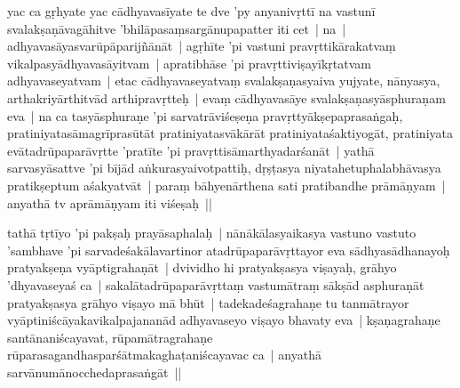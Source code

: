 \documentclass[article,12pt,a4paper]{memoir}%
\newcounter{parCount}
\begin{document}
	  
	  \pstart \leavevmode%
	\label{thakur75-73.8}yac ca gṛhyate yac cādhyavasīyate te dve 'py anyanivṛttī na vastunī svalakṣaṇāvagāhitve 'bhilāpasaṃsargānupapatter iti cet | \label{thakur75-73.9} na | adhyavasāyasvarūpāparijñānāt | agṛhīte 'pi vastuni pravṛttikārakatvaṃ vikalpasyādhyavasāyitvam | apratibhāse 'pi pravṛttiviṣayīkṛtatvam adhyavaseyatvam | etac cādhyavaseyatvaṃ svalakṣaṇasyaiva yujyate, nānyasya, arthakriyārthitvād arthipravṛtteḥ | \label{thakur75-73.12} evaṃ cādhyavasāye svalakṣaṇasyāsphuraṇam eva | na ca tasyāsphuraṇe 'pi sarvatrāviśeṣeṇa pravṛttyākṣepaprasaṅgaḥ, pratiniyatasāmagrīprasūtāt pratiniyatasvākārāt pratiniyataśaktiyogāt, pratiniyata evātadrūpaparāvṛtte 'pratīte 'pi pravṛttisāmarthyadarśanāt | yathā sarvasyāsattve 'pi bījād aṅkurasyaivotpattiḥ, dṛṣṭasya niyatahetuphalabhāvasya pratikṣeptum aśakyatvāt | paraṃ bāhyenārthena sati pratibandhe prāmāṇyam | anyathā tv aprāmāṇyam iti viśeṣaḥ ||
	{}
	\pend%
      

	  
	  \pstart \leavevmode%
	\label{thakur75-73.18}tathā tṛtīyo 'pi pakṣaḥ prayāsaphalaḥ | nānākālasyaikasya vastuno vastuto 'sambhave 'pi sarvadeśakālavartinor atadrūpaparāvṛttayor eva sādhyasādhanayoḥ pratyakṣeṇa vyāptigrahaṇāt |\label{thakur75-73.20} dvividho hi pratyakṣasya viṣayaḥ, grāhyo 'dhyavaseyaś ca | \label{ratnakīrtinibandhāvali__36r1OKKLAM78U8UT7RZ1GZQXEDK}sakalātadrūpaparāvṛttaṃ vastumātraṃ\label{ratnakīrtinibandhāvali__36r1OKKLAOUYW8OHNORUBKXVNLH} sākṣād asphuraṇāt pratyakṣasya grāhyo viṣayo mā bhūt | tadekadeśagrahaṇe tu tanmātrayor vyāptiniścāyakavikalpajananād adhyavaseyo viṣayo bhavaty eva | kṣaṇagrahaṇe santānaniścayavat, rūpamātragrahaṇe rūparasagandhasparśātmakaghaṭaniścayavac ca | anyathā sarvānumānocchedaprasaṅgāt ||
	{}
	\pend%
      
\end{document}
